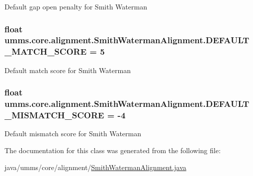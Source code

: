 Default gap open penalty for Smith Waterman \hypertarget{classumms_1_1core_1_1alignment_1_1_smith_waterman_alignment_a2f0dc35209fbabecd921df3ad9d83650}{
\subsubsection[{D\+E\+F\+A\+U\+L\+T\+\_\+\+M\+A\+T\+C\+H\+\_\+\+S\+C\+O\+R\+E}]{\setlength{\rightskip}{0pt plus 5cm}float umms.\+core.\+alignment.\+Smith\+Waterman\+Alignment.\+D\+E\+F\+A\+U\+L\+T\+\_\+\+M\+A\+T\+C\+H\+\_\+\+S\+C\+O\+R\+E = 5\hspace{0.3cm}{\ttfamily [static]}}}\label{classumms_1_1core_1_1alignment_1_1_smith_waterman_alignment_a2f0dc35209fbabecd921df3ad9d83650}
Default match score for Smith Waterman \hypertarget{classumms_1_1core_1_1alignment_1_1_smith_waterman_alignment_aa04f65708e3485da9e6723b6d9233a68}{
\subsubsection[{D\+E\+F\+A\+U\+L\+T\+\_\+\+M\+I\+S\+M\+A\+T\+C\+H\+\_\+\+S\+C\+O\+R\+E}]{\setlength{\rightskip}{0pt plus 5cm}float umms.\+core.\+alignment.\+Smith\+Waterman\+Alignment.\+D\+E\+F\+A\+U\+L\+T\+\_\+\+M\+I\+S\+M\+A\+T\+C\+H\+\_\+\+S\+C\+O\+R\+E = -\/4\hspace{0.3cm}{\ttfamily [static]}}}\label{classumms_1_1core_1_1alignment_1_1_smith_waterman_alignment_aa04f65708e3485da9e6723b6d9233a68}
Default mismatch score for Smith Waterman 

The documentation for this class was generated from the following file\+:\begin{DoxyCompactItemize}
\item 
java/umms/core/alignment/\hyperlink{_smith_waterman_alignment_8java}{Smith\+Waterman\+Alignment.\+java}\end{DoxyCompactItemize}
